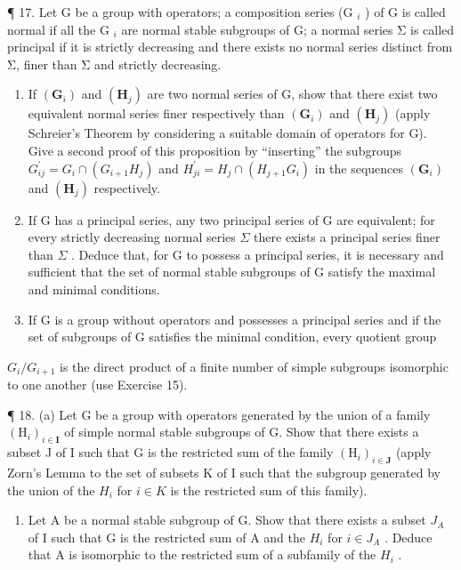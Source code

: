 ¶ 17. Let G be a group with operators; a composition series (G \(_{i}\) ) of G is called normal if all the G \(_{i}\) are normal stable subgroups of G; a normal series Σ is called principal if it is strictly decreasing and there exists no normal series distinct from Σ, finer than Σ and strictly decreasing.

\begin{enumerate}
\def\labelenumi{(\alph{enumi})}
\item
  If \((\mathbf{G}_{i})\) and \((\mathbf{H}_{j})\) are two normal series of G, show that there exist two equivalent normal series finer respectively than \((\mathbf{G}_{i})\) and \((\mathbf{H}_{j})\) (apply Schreier's Theorem by considering a suitable domain of operators for G). Give a second proof of this proposition by ``inserting'' the subgroups \(G_{ij}^{\prime} = G_{i} \cap (G_{i+1}H_{j})\) and \(H_{ji}^{\prime} = H_{j} \cap (H_{j+1}G_{i})\) in the sequences \((\mathbf{G}_{i})\) and \((\mathbf{H}_{j})\) respectively.
\item
  If G has a principal series, any two principal series of G are equivalent; for every strictly decreasing normal series \(\Sigma\) there exists a principal series finer than \(\Sigma\) . Deduce that, for G to possess a principal series, it is necessary and sufficient that the set of normal stable subgroups of G satisfy the maximal and minimal conditions.
\item
  If G is a group without operators and possesses a principal series and if the set of subgroups of G satisfies the minimal condition, every quotient group
\end{enumerate}

\(G_{i}/G_{i+1}\) is the direct product of a finite number of simple subgroups isomorphic to one another (use Exercise 15).

¶ 18. (a) Let G be a group with operators generated by the union of a family \((\mathrm{H}_{i})_{i\in\mathbf{I}}\) of simple normal stable subgroups of G. Show that there exists a subset J of I such that G is the restricted sum of the family \((\mathrm{H}_{i})_{i\in\mathbf{J}}\) (apply Zorn's Lemma to the set of subsets K of I such that the subgroup generated by the union of the \(H_{i}\) for \(i\in K\) is the restricted sum of this family).

\begin{enumerate}
\def\labelenumi{(\alph{enumi})}
\setcounter{enumi}{1}
\tightlist
\item
  Let A be a normal stable subgroup of G. Show that there exists a subset \(J_{A}\) of I such that G is the restricted sum of A and the \(H_{i}\) for \(i \in J_{A}\) . Deduce that A is isomorphic to the restricted sum of a subfamily of the \(H_{i}\) .
\end{enumerate}

